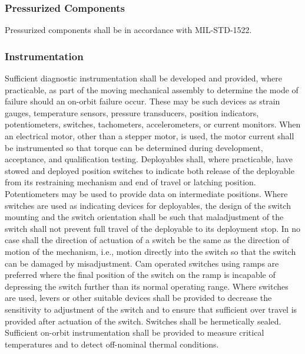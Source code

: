 \documentclass[12pt]{article}
\begin{document}
\subsubsection{Pressurized Components} %
Pressurized components shall be in accordance with MIL-STD-1522.

\subsubsection{Instrumentation} %
Sufficient diagnostic instrumentation shall be developed and provided, where practicable, as part of the moving mechanical assembly to determine the mode of failure should an on-orbit failure occur.
These may be such devices as strain gauges, temperature sensors, pressure transducers, position indicators, potentiometers, switches, tachometers, accelerometers, or current monitors.
When an electrical motor, other than a stepper motor, is used, the motor current shall be instrumented so that torque can be determined during development, acceptance, and qualification testing. 
Deployables shall, where practicable, have stowed and deployed position switches to indicate both release of the deployable from its restraining mechanism and end of travel or latching position. 
Potentiometers may be used to provide data on intermediate positions. 
Where switches are used as indicating devices for deployables, the design of the switch mounting and the switch orientation shall be such that maladjustment of the switch shall not prevent full travel of the deployable to its deployment stop. 
In no case shall the direction of actuation of a switch be the same as the direction of motion of the mechanism, i.e., motion directly into the switch so that the switch can be damaged by misadjustment. 
Cam operated switches using ramps are preferred where the final position of the switch on the ramp is incapable of depressing the switch further than its normal operating range. 
Where switches are used, levers or other suitable devices shall be provided to decrease the sensitivity to adjustment of the switch and to ensure that sufficient over travel is provided after actuation of the switch. 
Switches shall be hermetically sealed. 
Sufficient on-orbit instrumentation shall be provided to measure critical temperatures and to detect off-nominal thermal conditions.
\end{document}

